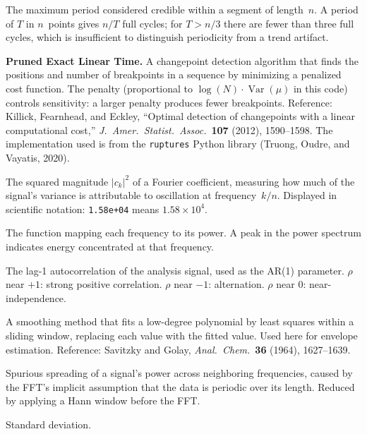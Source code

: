 \documentclass[11pt]{article}
\newcommand{\code}[1]{\texttt{#1}}
\begin{document}
\begin{description}[style=nextline, leftmargin=3cm]
\item[$n/3$] The maximum period considered credible within a segment of
  length~$n$.  A period of $T$ in $n$~points gives $n/T$ full cycles;
  for $T > n/3$ there are fewer than three full cycles, which is
  insufficient to distinguish periodicity from a trend artifact.

\item[PELT] \textbf{Pruned Exact Linear Time.}  A changepoint detection
  algorithm that finds the positions and number of breakpoints in a
  sequence by minimizing a penalized cost function.  The penalty
  (proportional to $\log(N) \cdot \operatorname{Var}(\mu)$ in this code)
  controls sensitivity: a larger penalty produces fewer breakpoints.
  Reference: Killick, Fearnhead, and Eckley, ``Optimal detection of
  changepoints with a linear computational cost,''
  \emph{J.\ Amer.\ Statist.\ Assoc.}\ \textbf{107} (2012), 1590--1598.
  The implementation used is from the \code{ruptures} Python library
  (Truong, Oudre, and Vayatis, 2020).

\item[Power] The squared magnitude $|c_k|^2$ of a Fourier coefficient,
  measuring how much of the signal's variance is attributable to
  oscillation at frequency~$k/n$.  Displayed in scientific notation:
  \code{1.58e+04} means $1.58 \times 10^4$.

\item[Power spectrum] The function mapping each frequency to its power.
  A peak in the power spectrum indicates energy concentrated at that
  frequency.

\item[rho ($\rho$)] The lag-1 autocorrelation of the analysis signal,
  used as the AR(1) parameter.  $\rho$ near $+1$: strong positive
  correlation.  $\rho$ near $-1$: alternation.  $\rho$ near $0$:
  near-independence.

\item[Savitzky--Golay filter] A smoothing method that fits a low-degree
  polynomial by least squares within a sliding window, replacing each
  value with the fitted value.  Used here for envelope estimation.
  Reference: Savitzky and Golay, \emph{Anal.\ Chem.}\ \textbf{36}
  (1964), 1627--1639.

\item[Spectral leakage] Spurious spreading of a signal's power across
  neighboring frequencies, caused by the FFT's implicit assumption that
  the data is periodic over its length.  Reduced by applying a Hann
  window before the FFT.

\item[std dev] Standard deviation.
\end{description}
\end{document}
